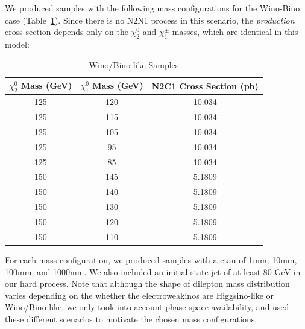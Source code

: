 \documentclass{article}
\begin{document}
\par
We produced samples with the following mass configurations for the Wino-Bino case (Table~\ref{table:2}). Since there is no N2N1 process in this scenario, the \textit{production} cross-section depends only on the $\chi^{0}_{2}$ and $\chi^{\pm}_{1}$ masses, which are identical in this model:
\begin{centering}
    \begin{table}[h]
        \begin{tabular}{||c|c|c||}
             \hline $\chi^{0}_{2}$ Mass (GeV) & $\chi^{0}_{1}$ Mass (GeV) & N2C1 Cross Section (pb) \\ 
             \hline
             125 & 120 & 10.034\\
             \hline
             125 & 115 & 10.034\\
             \hline
             125 & 105 & 10.034\\
             \hline
             125 & 95 & 10.034\\
             \hline
             125 & 85 & 10.034\\
             \hline
             150 & 145 & 5.1809\\
             \hline
             150 & 140 & 5.1809\\
             \hline
             150 & 130 & 5.1809\\
             \hline
             150 & 120 & 5.1809\\
             \hline
             150 & 110 & 5.1809\\
             \hline
        \end{tabular}
        \caption{Wino/Bino-like Samples}
        \label{table:2}
    \end{table}
\end{centering}
\par
For each mass configuration, we produced samples with a ctau of 1mm, 10mm, 100mm, and 1000mm. We also included an initial state jet of at least 80 GeV in our hard process. Note that although the shape of dilepton mass distribution varies depending on the whether the electroweakinos are Higgsino-like or Wino/Bino-like, we only took into account phase space availability, and used these different scenarios to motivate the chosen mass configurations.
\end{document}

